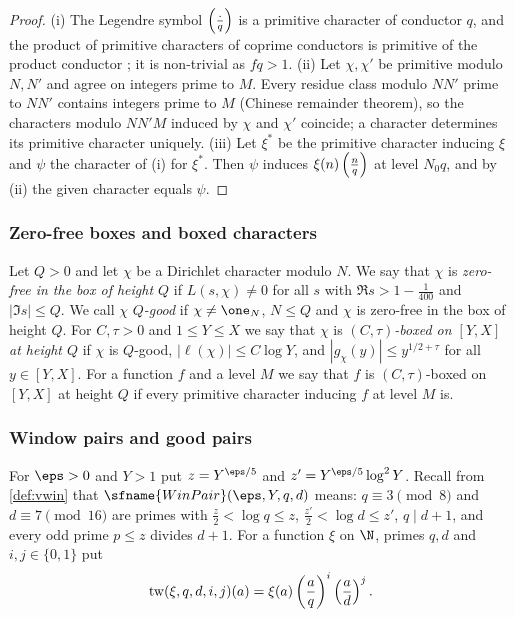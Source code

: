 \begin{proof}
(i) The Legendre symbol $\left(\frac{\cdot}{q}\right)$ is a primitive character of conductor $q$, and the product of primitive
characters of coprime conductors is primitive of the product conductor \cite[Ch.~5]{Davenport2000}; it is non-trivial as
$fq>1$. (ii) Let $\chi,\chi'$ be primitive modulo $N,N'$ and agree on integers prime to $M$. Every residue class modulo
$NN'$ prime to $NN'$ contains integers prime to $M$ (Chinese remainder theorem), so the characters modulo $NN'M$
induced by $\chi$ and $\chi'$ coincide; a character determines its primitive character uniquely. (iii) Let $\xi^*$ be the
primitive character inducing $\xi$ and $\psi$ the character of (i) for $\xi^*$. Then $\psi$ induces
$\xi(n)\left(\frac{n}{q}\right)$ at level $N_0q$, and by (ii) the given character equals $\psi$.
\end{proof}

\subsubsection{Zero-free boxes and boxed characters}

\begin{definition}\label{pf:top-supply:box}
Let $Q>0$ and let $\chi$ be a Dirichlet character modulo $N$. We say that $\chi$ is \emph{zero-free in the box of
height $Q$} if $L(s,\chi)\ne0$ for all $s$ with $\Re s>1-\frac1{400}$ and $|\Im s|\le Q$. We call $\chi$
\emph{$Q$-good} if $\chi\ne\one_N$, $N\le Q$ and $\chi$ is zero-free in the box of height $Q$. For $C,\tau>0$ and
$1\le Y\le X$ we say that $\chi$ is \emph{$(C,\tau)$-boxed on $[Y,X]$ at height $Q$} if $\chi$ is $Q$-good,
$|\ell(\chi)|\le C\log Y$, and $|g_\chi(y)|\le y^{1/2+\tau}$ for all $y\in[Y,X]$.
For a function $f$ and a level $M$ we say that $f$ is $(C,\tau)$-boxed on $[Y,X]$ at height $Q$ if every
primitive character inducing $f$ at level $M$ is.
 
   
\end{definition}

\subsubsection{Window pairs and good pairs}

For $\eps>0$ and $Y>1$ put $z=Y^{\eps/5}$ and $z'=Y^{\eps/5}\log^2Y$. Recall from \cref{def:vwin} that
$\sfname{WinPair}(\eps,Y,q,d)$ means: $q\equiv3\pmod8$ and $d\equiv7\pmod{16}$ are primes with
$\frac z2<\log q\le z$, $\frac{z'}2<\log d\le z'$, $q\mid d+1$, and every odd prime $p\le z$ divides $d+1$.
For a function $\xi$ on $\N$, primes $q,d$ and $i,j\in\{0,1\}$ put
\[
\operatorname{tw}(\xi,q,d,i,j)(a)=\xi(a)\left(\frac{a}{q}\right)^i\left(\frac{a}{d}\right)^j .
\]

